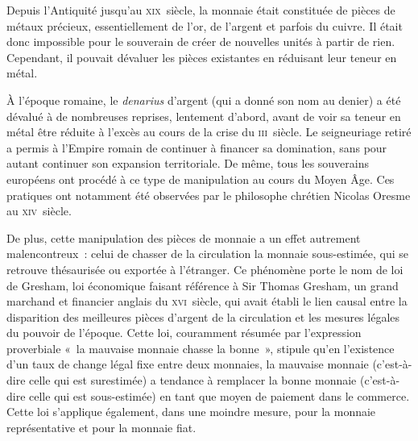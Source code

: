 
Depuis l'Antiquité jusqu'au \textsc{xix}\ieme{}~siècle, la monnaie était constituée de pièces de métaux précieux, essentiellement de l'or, de l'argent et parfois du cuivre. Il était donc impossible pour le souverain de créer de nouvelles unités à partir de rien. Cependant, il pouvait dévaluer les pièces existantes en réduisant leur teneur en métal.

À l'époque romaine, le \emph{denarius} d'argent (qui a donné son nom au denier) a été dévalué à de nombreuses reprises, lentement d'abord, avant de voir sa teneur en métal être réduite à l'excès au cours de la crise du \textsc{iii}\ieme{}~siècle. Le seigneuriage retiré a permis à l'Empire romain de continuer à financer sa domination, sans pour autant continuer son expansion territoriale. De même, tous les souverains européens ont procédé à ce type de manipulation au cours du Moyen Âge. Ces pratiques ont notamment été observées par le philosophe chrétien Nicolas Oresme au \textsc{xiv}\ieme{}~siècle. %

De plus, cette manipulation des pièces de monnaie a un effet autrement malencontreux~: celui de chasser de la circulation la monnaie sous-estimée, qui se retrouve thésaurisée ou exportée à l'étranger. Ce phénomène porte le nom de loi de Gresham, loi économique faisant référence à Sir Thomas Gresham, un grand marchand et financier anglais du \textsc{xvi}\ieme{}~siècle, qui avait établi le lien causal entre la disparition des meilleures pièces d'argent de la circulation et les mesures légales du pouvoir de l'époque. Cette loi, couramment résumée par l'expression proverbiale «~la mauvaise monnaie chasse la bonne~», stipule qu'en l'existence d'un taux de change légal fixe entre deux monnaies, la mauvaise monnaie (c'est-à-dire celle qui est surestimée) a tendance à remplacer la bonne monnaie (c'est-à-dire celle qui est sous-estimée) en tant que moyen de paiement dans le commerce. Cette loi s'applique également, dans une moindre mesure, pour la monnaie représentative et pour la monnaie fiat.

